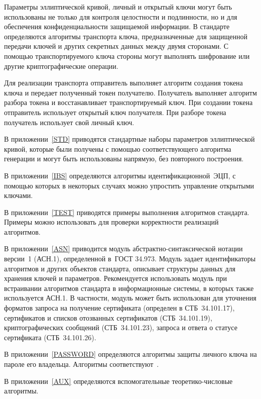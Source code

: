 Параметры эллиптической кривой, личный и открытый ключи могут 
быть использованы не только для контроля целостности и подлинности, 
но и для обеспечения конфиденциальности защищаемой информации.
%
В стандарте определяются алгоритмы транспорта ключа, 
предназначенные для защищенной передачи ключей 
и других секретных данных между двумя сторонами. 
%
С помощью транспортируемого ключа стороны могут выполнять 
шифрование или другие криптографические операции.

Для реализации транспорта отправитель 
выполняет алгоритм создания токена 
ключа и передает полученный токен получателю.
%
Получатель выполняет алгоритм разбора токена и восстанавливает
транспортируемый ключ.
%
При создании токена отправитель использует открытый ключ получателя.
При разборе токена получатель использует свой личный ключ.

В приложении~\ref{STD} приводятся стандартные наборы параметров
эллиптической кривой, которые были получены с помощью 
соответствующего алгоритма генерации 
и могут быть использованы напрямую, без повторного построения.

В приложении~\ref{IBS} определяются алгоритмы 
идентификационной~ЭЦП, с помощью которых в некоторых случаях можно 
упростить управление открытыми ключами.

В приложении~\ref{TEST} приводятся примеры выполнения 
алгоритмов стандарта.
Примеры можно использовать для проверки корректности реализаций 
алгоритмов.

В приложении~\ref{ASN} приводится модуль
абстрактно-синтаксической нотации версии~1 (АСН.1),
определенной в~ГОСТ 34.973.
Модуль задает идентификаторы алгоритмов и других объектов 
стандарта, описывает структуры данных для хранения 
ключей и параметров.
%
Рекомендуется использовать модуль 
при встраивании алгоритмов стандарта в информационные системы, 
в которых также используется АСН.1.
В частности, модуль может быть использован для уточнения 
форматов запроса на получение сертификата (определен в СТБ~34.101.17),
сертификатов и списков отозванных сертификатов (СТБ~34.101.19),
криптографических сообщений (СТБ~34.101.23),
запроса и ответа о статусе сертификата (СТБ~34.101.26).

В приложении~\ref{PASSWORD} определяются алгоритмы защиты личного ключа
на пароле его владельца. Алгоритмы соответствуют~\cite{PKCS5}.

В приложении~\ref{AUX} определяются вспомогательные теоретико-числовые 
алгоритмы.

